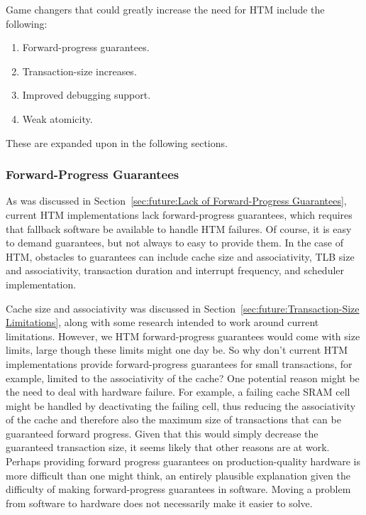 Game changers that could greatly increase the need for HTM include
the following:

\begin{enumerate}
\item	Forward-progress guarantees.
\item	Transaction-size increases.
\item	Improved debugging support.
\item	Weak atomicity.
\end{enumerate}

These are expanded upon in the following sections.

\subsubsection{Forward-Progress Guarantees}
\label{sec:future:Forward-Progress Guarantees}

As was discussed in
Section~\ref{sec:future:Lack of Forward-Progress Guarantees},
current HTM implementations lack forward-progress guarantees, which requires
that fallback software be available to handle HTM failures.
Of course, it is easy to demand guarantees, but not always to easy
to provide them.
In the case of HTM, obstacles to guarantees can include cache size and
associativity, TLB size and associativity, transaction duration and
interrupt frequency, and scheduler implementation.

Cache size and associativity was discussed in
Section~\ref{sec:future:Transaction-Size Limitations},
along with some research intended to work around current limitations.
However, we HTM forward-progress guarantees would
come with size limits, large though these limits might one day be.
So why don't current HTM implementations provide forward-progress
guarantees for small transactions, for example, limited to the
associativity of the cache?
One potential reason might be the need to deal with hardware failure.
For example, a failing cache SRAM cell might be handled by deactivating
the failing cell, thus reducing the associativity of the cache and
therefore also the maximum size of transactions that can be guaranteed
forward progress.
Given that this would simply decrease the guaranteed transaction size,
it seems likely that other reasons are at work.
Perhaps providing forward progress guarantees on production-quality
hardware is more difficult than one might think, an entirely plausible
explanation given the difficulty of making forward-progress guarantees
in software.
Moving a problem from software to hardware does not necessarily make
it easier to solve.

